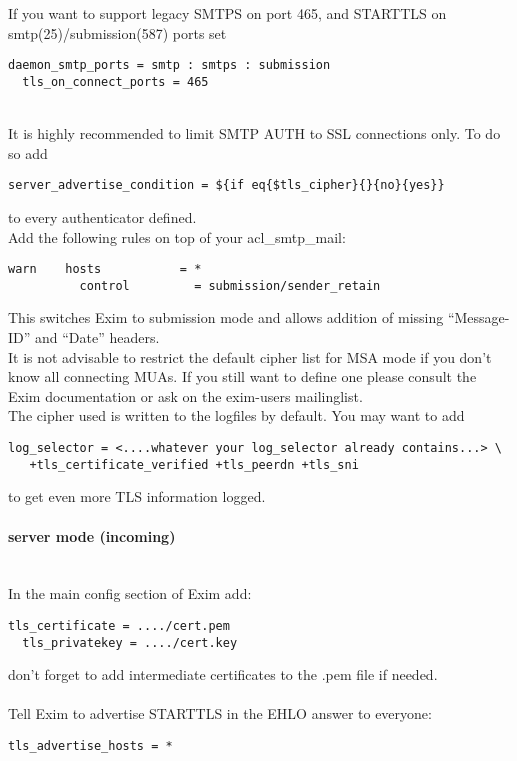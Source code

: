 If you want to support legacy SMTPS on port 465, and STARTTLS on smtp(25)/submission(587) ports set
\begin{lstlisting}[breaklines]
  daemon_smtp_ports = smtp : smtps : submission
  tls_on_connect_ports = 465
\end{lstlisting}
\mbox{}\\
It is highly recommended to limit SMTP AUTH to SSL connections only. To do so add
\begin{lstlisting}[breaklines]
  server_advertise_condition = ${if eq{$tls_cipher}{}{no}{yes}}
\end{lstlisting}
to every authenticator defined.\\

Add the following rules on top of your acl\_smtp\_mail:
\begin{lstlisting}[breaklines]
  warn    hosts           = *
          control         = submission/sender_retain
\end{lstlisting}
This switches Exim to submission mode and allows addition of missing ``Message-ID'' and ``Date'' headers.\\

It is not advisable to restrict the default cipher list for MSA mode if you don't know all connecting MUAs. If you still want to define one please consult the Exim documentation or ask on the exim-users mailinglist.\\

The cipher used is written to the logfiles by default. You may want to add
\begin{lstlisting}[breaklines]
  log_selector = <....whatever your log_selector already contains...> \
   +tls_certificate_verified +tls_peerdn +tls_sni
\end{lstlisting}
to get even more TLS information logged.


\paragraph*{server mode (incoming)}\mbox{}\\

In the main config section of Exim add:

\begin{lstlisting}[breaklines]
  tls_certificate = ..../cert.pem
  tls_privatekey = ..../cert.key
\end{lstlisting}
don't forget to add intermediate certificates to the .pem file if needed.\\
\\
Tell Exim to advertise STARTTLS in the EHLO answer to everyone:
\begin{lstlisting}[breaklines]
  tls_advertise_hosts = *
\end{lstlisting}

